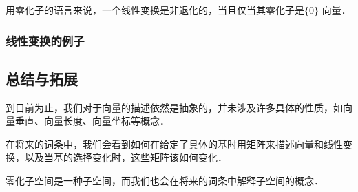 用零化子的语言来说，一个线性变换是非退化的，当且仅当其零化子是$\{{0}\}$ 向量．

\subsubsection{线性变换的例子}

\subsection{总结与拓展}

到目前为止，我们对于向量的描述依然是抽象的，并未涉及许多具体的性质，如向量垂直、向量长度、向量坐标等概念．

在将来的词条中，我们会看到如何在给定了具体的基时用矩阵来描述向量和线性变换，以及当基的选择变化时，这些矩阵该如何变化．

零化子空间是一种子空间，而我们也会在将来的词条中解释子空间的概念．
